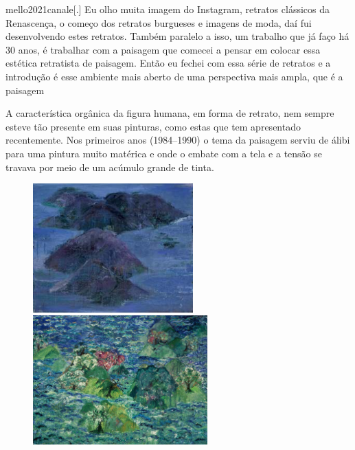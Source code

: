 \begin{displaycquote}{mello2021canale}[.]
	Eu olho muita imagem do Instagram, retratos clássicos da Renascença, o
	começo dos retratos burgueses e imagens de moda, daí fui desenvolvendo
	estes retratos. Também paralelo a isso, um trabalho que já faço há 30
	anos, é trabalhar com a paisagem que comecei a pensar em colocar essa
	estética retratista de paisagem. Então eu fechei com essa série de
	retratos e a introdução é esse ambiente mais aberto de uma perspectiva
	mais ampla, que é a paisagem
\end{displaycquote}

A característica orgânica da figura humana, em forma de retrato, nem
sempre esteve tão presente em suas pinturas, como estas que tem
apresentado recentemente. Nos primeiros anos (1984--1990) o tema da
paisagem serviu de álibi para uma pintura muito matérica e onde o
embate com a tela e a tensão se travava por meio de um acúmulo grande
de tinta.

\begin{figure}[b]
	\begin{minipage}{.45\linewidth}
		\caption{}
		\includegraphics[width=2.42898in,height=1.95536in]{figuras/canale-arquipelago-1990.pdf.compressed.pdf}

    \end{minipage}\hfill
	\begin{minipage}{.45\linewidth}
		\caption{}
		\includegraphics[width=2.6407in,height=1.95427in]{figuras/canale-new-age-1991.pdf.compressed.pdf}
	\end{minipage}
\end{figure}
\clearpage

